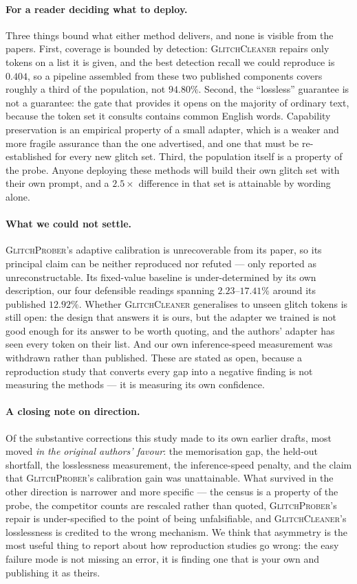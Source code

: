 \documentclass[11pt,a4paper]{article}
\newcommand{\gp}{\textsc{GlitchProber}}
\newcommand{\gc}{\textsc{GlitchCleaner}}
\begin{document}
\paragraph{For a reader deciding what to deploy.} Three things bound what either
method delivers, and none is visible from the papers. First, coverage is bounded
by detection: \gc{} repairs only tokens on a list it is given, and the best
detection recall we could reproduce is $0.404$, so a pipeline assembled from these
two published components covers roughly a third of the population, not
$94.80\%$. Second, the ``lossless'' guarantee is not a guarantee: the gate that
provides it opens on the majority of ordinary text, because the token set it
consults contains common English words. Capability preservation is an empirical
property of a small adapter, which is a weaker and more fragile assurance than the
one advertised, and one that must be re-established for every new glitch set.
Third, the population itself is a property of the probe. Anyone deploying these
methods will build their own glitch set with their own prompt, and a
$2.5\times$ difference in that set is attainable by wording alone.

\paragraph{What we could not settle.} \gp{}'s adaptive calibration is
unrecoverable from its paper, so its principal claim can be neither reproduced nor
refuted --- only reported as unreconstructable. Its fixed-value baseline is
under-determined by its own description, our four defensible readings spanning
$2.23$--$17.41\%$ around its published $12.92\%$. Whether \gc{} generalises to
unseen glitch tokens is still open: the design that answers it is ours, but the
adapter we trained is not good enough for its answer to be worth quoting, and the
authors' adapter has seen every token on their list. And our own inference-speed
measurement was withdrawn rather than published. These are stated as open, because
a reproduction study that converts every gap into a negative finding is not
measuring the methods --- it is measuring its own confidence.

\paragraph{A closing note on direction.} Of the substantive corrections this study
made to its own earlier drafts, most moved \emph{in the original authors' favour}:
the memorisation gap, the held-out shortfall, the losslessness measurement, the
inference-speed penalty, and the claim that \gp{}'s calibration gain was
unattainable. What survived in the other direction is narrower and more specific
--- the census is a property of the probe, the competitor counts are rescaled
rather than quoted, \gp{}'s repair is under-specified to the point of being
unfalsifiable, and \gc{}'s losslessness is credited to the wrong mechanism. We
think that asymmetry is the most useful thing to report about how reproduction
studies go wrong: the easy failure mode is not missing an error, it is finding
one that is your own and publishing it as theirs.
\end{document}
